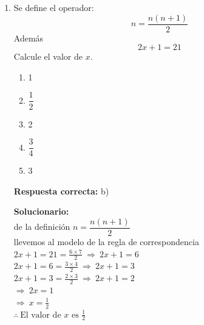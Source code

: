 \begin{enumerate}
\textbf{Respuesta correcta:} a)

\vspace{2mm}
\textbf{Solucionario:}\\

Sea el número de dos cifras $\overline{xy}$\\
$
xy-27 = yx\\
$
$
x-y = 3\\
$
$
\Rightarrow 10x+y-27 = 10y+x\\
$
$
10x-x+y-10y = 27\\
$
$
9x-9y = 27\\
$
$
x-y = 3\\
$
luego
$
\begin{aligned}
	x+y &= 9\\
	x-y &= 3\\ \hline
	2x &= 12
\end{aligned}
$\\
donde: $x=6$, $y=3$, el numero será 63,\\
entonces el producto es: $6x3=18$





\vspace{6mm}







\item  Se define el operador:
\[
\boxed{n}=\frac{n(n+1)}{2}
\]
Además
\[
\boxed{\boxed{\boxed{2x+1}}}=21
\]
Calcule el valor de $x$.

\begin{enumerate}[label=\alph*)]
	\item 1
	\item $\dfrac{1}{2}$
	\item 2
	\item $\dfrac{3}{4}$
	\item 3
\end{enumerate}

\textbf{Respuesta correcta:} b)

\vspace{2mm}
\textbf{Solucionario:}\\

de la definición $\boxed{n}=\dfrac{n(n+1)}{2}$\\
llevemos al modelo de la regla de correspondencia\\[1mm]
$\boxed{\boxed{\boxed{2x+1}}}=21=\frac{6\times 7}{2}\ \Rightarrow\ \boxed{\boxed{2x+1}}=6$\\
$\boxed{\boxed{2x+1}}=6=\frac{3\times 4}{2}\ \Rightarrow\ \boxed{2x+1}=3$\\
$\boxed{2x+1}=3=\frac{2\times 3}{2}\ \Rightarrow\ 2x+1=2$\\
$\Rightarrow\ 2x=1$\\
$\Rightarrow\ x=\frac{1}{2}$\\
$\therefore\ \text{El valor de $x$ es }\frac{1}{2}$\\





\end{enumerate}
